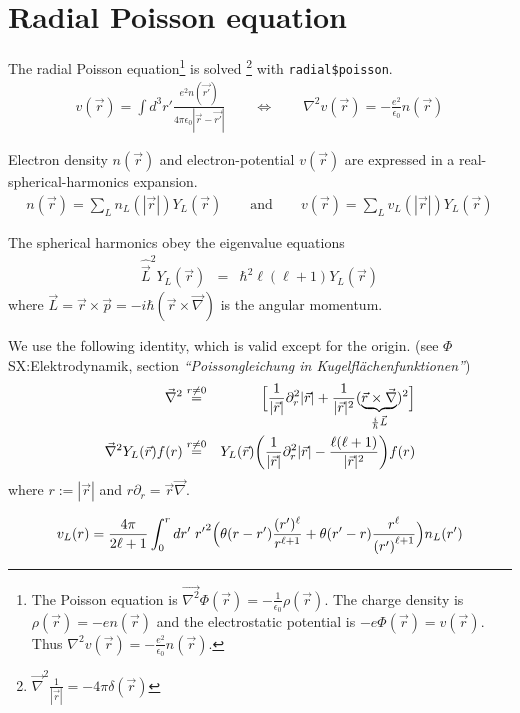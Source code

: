 \documentclass[11pt,a4paper]{report}
\begin{document}
\section{Radial Poisson equation}
\label{sec:radialpoisson}
The radial Poisson equation\footnote{The Poisson equation is
  $\vec{\nabla^2}\Phi(\vec{r})=-\frac{1}{\epsilon_0}\rho(\vec{r})$.
  The charge density is $\rho(\vec{r})=-en(\vec{r})$ and the
  electrostatic potential is $-e\Phi(\vec{r})=v(\vec{r})$.  Thus
  $\nabla^2 v(\vec{r})=-\frac{e^2}{\epsilon_0}n(\vec{r})$.}  is solved
\footnote{$\vec{\nabla}^2\frac{1}{|\vec{r}|}=-4\pi\delta(\vec{r})$}
with \verb|radial$poisson|.
\begin{eqnarray}
v(\vec{r})=\int d^3r'\frac{e^2n(\vec{r'})}{4\pi\epsilon_0|\vec{r}-\vec{r'}|}
\qquad\Leftrightarrow\qquad
\nabla^2v(\vec{r})=-\frac{e^2}{\epsilon_0}n(\vec{r})
\end{eqnarray}

Electron density $n(\vec{r})$ and electron-potential $v(\vec{r})$ are
expressed in a real-spherical-harmonics expansion.
\begin{eqnarray}
n(\vec{r})=\sum_{L} n_{L}(|\vec{r}|) Y_L(\vec{r})
\qquad\text{and}\qquad
v(\vec{r})=\sum_{L} v_{L}(|\vec{r}|) Y_L(\vec{r})
\end{eqnarray}

The spherical harmonics obey the eigenvalue equations
\begin{eqnarray}
\hat{\vec{L}}^2Y_L(\vec{r})&=& \hbar^2\ell(\ell+1)Y_L(\vec{r})
\end{eqnarray}
where
$\vec{L}=\vec{r}\times\vec{p}=-i\hbar(\vec{r}\times\vec{\nabla})$ is
the angular momentum.

We use the following identity, which is valid except for the origin.
(see $\Phi$SX:Elektrodynamik, section \textit{``Poissongleichung in
  Kugelfl\"achenfunktionen''})
\begin{eqnarray}
\vec{\nabla}^2 
&\stackrel{r\neq0}{=}&
\Bigl[\frac{1}{|\vec{r}|}\partial_r^2|\vec{r}|
+\frac{1}{|\vec{r}|^2 }
(\underbrace{\vec{r}\times\vec{\nabla}}_{\frac{i}{\hbar}\vec{L}})^2
\Bigr] 
\nonumber\\
\vec{\nabla}^2 Y_L(\vec{r})f(r)
&\stackrel{r\neq0}{=}&
Y_L(\vec{r})\biggl(\frac{1}{|\vec{r}|}\partial_r^2|\vec{r}|
-\frac{\ell(\ell+1)}{|\vec{r}|^2}
\biggr)f(r)
\end{eqnarray}
where $r:=|\vec{r}|$ and $r\partial_r=\vec{r}\vec{\nabla}$.

\begin{eqnarray}
v_L(r)=\frac{4\pi}{2\ell+1}
\int_0^rdr'\;{r'}^2\Bigl(
\theta(r-r')\frac{(r')^\ell}{r^{\ell+1}}
+\theta(r'-r)\frac{{r}^\ell}{{(r')}^{\ell+1}}\Bigr)n_L(r')
\end{eqnarray}
\end{document}
